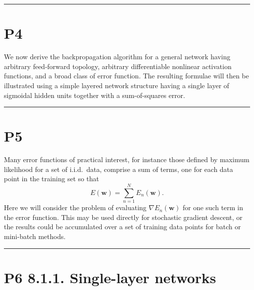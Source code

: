 \documentclass{article}
\begin{document}

\noindent\rule{\linewidth}{0.4pt}

\section{P4}

We now derive the backpropagation algorithm for a general network having arbitrary feed-forward topology, arbitrary differentiable nonlinear activation functions, and a broad class of error function. The resulting formulae will then be illustrated using a simple layered network structure having a single layer of sigmoidal hidden units together with a sum-of-squares error.

\noindent\rule{\linewidth}{0.4pt}

\section{P5}

Many error functions of practical interest, for instance those defined by maximum likelihood for a set of i.i.d.\ data, comprise a sum of terms, one for each data point in the training set so that
\begin{equation}
    E(\mathbf{w}) = \sum_{n=1}^N E_n(\mathbf{w}).
    \tag{8.1}
\end{equation}
Here we will consider the problem of evaluating $\nabla E_n(\mathbf{w})$ for one such term in the error function. This may be used directly for stochastic gradient descent, or the results could be accumulated over a set of training data points for batch or mini-batch methods.

\noindent\rule{\linewidth}{0.4pt}

\section{P6 8.1.1. Single-layer networks}
\end{document}
